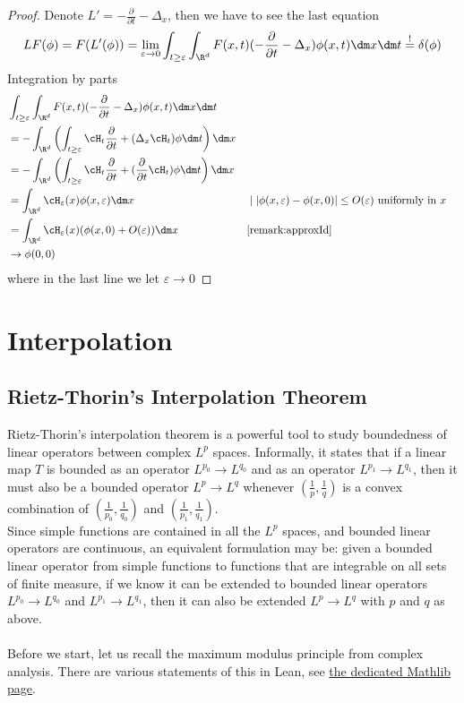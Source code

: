\begin{proof}
	Denote $L' = -  \frac{\partial}{\partial t} - \Delta_x$, then we have to see the last equation
	\[LF (\phi) = F(L'(\phi)) = \lim_{\varepsilon \to 0} \int_{t \ge \varepsilon} \int_{\R^d} F(x,t) ( -\frac{\partial}{\partial t} - \Delta_x) \phi(x,t) \dm x \dm t \overset{!}{=} \delta(\phi)
	\]
	Integration by parts
	\begin{align*}
		& \int_{t \ge \varepsilon} \int_{\R^d} F(x,t) ( -\frac{\partial}{\partial t} - \Delta_x) \phi(x,t) \dm x \dm t \\
		&= -  \int_{\R^d} \left(\int_{t \ge \varepsilon} \cH_t \frac{\partial}{\partial t} + (\Delta_x \cH_t) \phi \dm t \right) \dm x \\
		&= - \int_{\R^d} \left(\int_{t \ge \varepsilon} \cH_t \frac{\partial}{\partial t} + ( \frac{\partial}{\partial t} \cH_t) \phi \dm t \right ) \dm x \\
		&= \int_{\R^d} \cH_\varepsilon(x) \phi(x,\varepsilon) \dm x && \mid |\phi(x,\varepsilon) - \phi(x,0)| \le O(\varepsilon) \text{ uniformly in } x \\
		&= \int_{\R^d} \cH_\varepsilon(x) (\phi(x,0) + O(\varepsilon)) \dm x && \ref{remark:approxId}\\
		&\to \phi(0,0)
	\end{align*}
where in the last line we let $\varepsilon \to 0$
\end{proof}



\chapter{Interpolation}
\label{chap:interpolation}

\section{Rietz-Thorin's Interpolation Theorem}
Rietz-Thorin's interpolation theorem is a powerful tool to study boundedness of linear operators between complex $L^p$ spaces.
Informally, it states that if a linear map $T$ is bounded as an operator $L^{p_0}\to L^{q_0}$ and as an operator $L^{p_1} \to L^{q_1}$, then
it must also be a bounded operator $L^p \to L^q$ whenever $\left(\frac{1}{p}, \frac{1}{q}\right)$ is a convex combination of $\left(\frac{1}{p_0}, \frac{1}{q_0}\right)$ and $\left(\frac{1}{p_1}, \frac{1}{q_1}\right)$.\\
Since simple functions are contained in all the $L^p$ spaces, and bounded linear operators are continuous, an equivalent formulation may be: given a bounded linear operator from simple functions to functions that are integrable on all sets of finite measure, if we know it can be extended to bounded linear
operators $L^{p_0} \to L^{q_0}$ and $L^{p_1} \to L^{q_1}$, then it can also be extended $L^p \to L^q$ with $p$ and $q$ as above.\\\\
Before we start, let us recall the maximum modulus principle from complex analysis.
There are various statements of this in Lean, see \href{https://leanprover-community.github.io/mathlib4_docs/Mathlib/Analysis/Complex/AbsMax.html}{the dedicated Mathlib page}.

